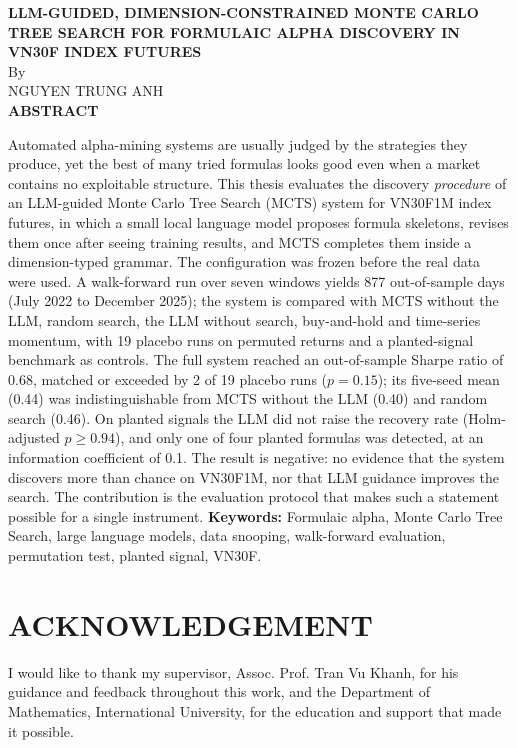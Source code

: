 \documentclass[12pt,a4paper,oneside]{book}
\theoremstyle{definition}
\newcommand{\thesistitle}{LLM-GUIDED, DIMENSION-CONSTRAINED MONTE CARLO TREE SEARCH FOR FORMULAIC ALPHA DISCOVERY IN VN30F INDEX FUTURES}
\newcommand{\studentname}{NGUYEN TRUNG ANH}
\begin{document}
	\newpage
	\thispagestyle{plain}
	\begin{center}
		\large\textbf{\thesistitle} \\
		\normalsize{By}\\
		\large{\studentname}\\
		\vspace*{0.5cm}
	\large\textbf{ABSTRACT}\\
	\end{center}
	\vskip2mm
Automated alpha-mining systems are usually judged by the strategies they produce, yet the best of many tried formulas looks good even when a market contains no exploitable structure. This thesis evaluates the discovery \emph{procedure} of an LLM-guided Monte Carlo Tree Search (MCTS) system for VN30F1M index futures, in which a small local language model proposes formula skeletons, revises them once after seeing training results, and MCTS completes them inside a dimension-typed grammar. The configuration was frozen before the real data were used. A walk-forward run over seven windows yields 877 out-of-sample days (July 2022 to December 2025); the system is compared with MCTS without the LLM, random search, the LLM without search, buy-and-hold and time-series momentum, with 19 placebo runs on permuted returns and a planted-signal benchmark as controls. The full system reached an out-of-sample Sharpe ratio of 0.68, matched or exceeded by 2 of 19 placebo runs ($p = 0.15$); its five-seed mean (0.44) was indistinguishable from MCTS without the LLM (0.40) and random search (0.46). On planted signals the LLM did not raise the recovery rate (Holm-adjusted $p \ge 0.94$), and only one of four planted formulas was detected, at an information coefficient of 0.1. The result is negative: no evidence that the system discovers more than chance on VN30F1M, nor that LLM guidance improves the search. The contribution is the evaluation protocol that makes such a statement possible for a single instrument.
\vskip10mm
\textbf{Keywords:} Formulaic alpha, Monte Carlo Tree Search, large language models, data snooping, walk-forward evaluation, permutation test, planted signal, VN30F.

\newpage
\clearpage
\chapter*{ACKNOWLEDGEMENT}

I would like to thank my supervisor, Assoc. Prof. Tran Vu Khanh, for his guidance and feedback throughout this work, and the Department of Mathematics, International University, for the education and support that made it possible.
\end{document}
